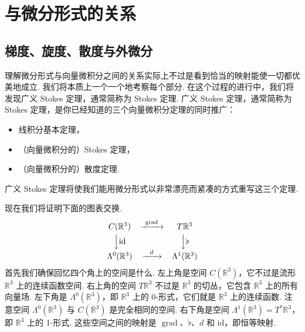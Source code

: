\section{与微分形式的关系}

\subsection{梯度、旋度、散度与外微分}

理解微分形式与向量微积分之间的关系实际上不过是看到恰当的映射能使一切都优美地成立. 我们将本质上一个一个地考察每个部分. 在这个过程的进行中，我们将发现广义 Stokes 定理，通常简称为 Stokes 定理. 广义 Stokes 定理，通常简称为 Stokes 定理，是你已经知道的三个向量微积分定理的同时推广：
\begin{itemize}
  \item 线积分基本定理，
  \item （向量微积分的）Stokes 定理，
  \item （向量微积分的）散度定理.
\end{itemize}
广义 Stokes 定理将使我们能用微分形式以非常漂亮而紧凑的方式重写这三个定理.

现在我们将证明下面的图表交换.
\[
\begin{array}{ccc}
C(\mathbb{R}^3)&\xrightarrow{\ \operatorname{grad}\ }&T\mathbb{R}^3\\[3pt]
\Big\downarrow \mathrm{id}&&\Big\downarrow \flat\\[3pt]
\Lambda^0(\mathbb{R}^3)&\xrightarrow{\ \ d\ \ }&\Lambda^1(\mathbb{R}^3)
\end{array}
\]
首先我们确保回忆四个角上的空间是什么. 左上角是空间 $C(\mathbb{R}^3)$，它不过是流形 $\mathbb{R}^3$ 上的连续函数空间. 右上角的空间 $T\mathbb{R}^3$ 不过是 $\mathbb{R}^3$ 的切丛，它包含 $\mathbb{R}^3$ 上的所有向量场. 左下角是 $\Lambda^0(\mathbb{R}^3)$，即 $\mathbb{R}^3$ 上的 0-形式，它们就是 $\mathbb{R}^3$ 上的连续函数. 注意空间 $\Lambda^0(\mathbb{R}^3)$ 与 $C(\mathbb{R}^3)$ 是完全相同的空间. 右下角是空间 $\Lambda^1(\mathbb{R}^3)=T^*\mathbb{R}^3$，即 $\mathbb{R}^3$ 上的 1-形式. 这些空间之间的映射是 $\operatorname{grad}$、$\flat$、$d$ 和 $\mathrm{id}$，即恒等映射.

